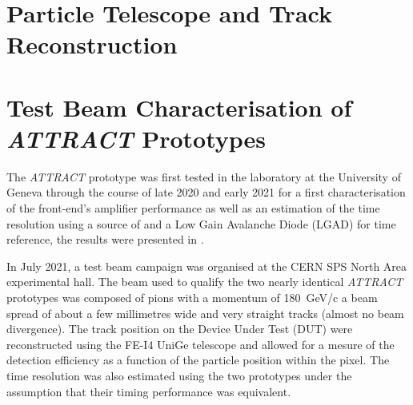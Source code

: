%	

	\section{Particle Telescope and Track Reconstruction}

	\clearpage
	\section{Test Beam Characterisation of \textit{ATTRACT} Prototypes}
		The \textit{ATTRACT} prototype was first tested in the laboratory at the University of Geneva through the course of late 2020 and early 2021 for a first characterisation of the front-end's amplifier performance as well as an estimation of the time resolution using a source of \Sr and a Low Gain Avalanche Diode (LGAD) for time reference, the results were presented in \cite{Moretti_MasterThesis}.
		
		In July 2021, a test beam campaign was organised at the CERN SPS North Area experimental hall. The beam used to qualify the two nearly identical \textit{ATTRACT} prototypes was composed of pions with a momentum of \SI{180}{\giga\electronvolt}/c a beam spread of about a few millimetres wide and very straight tracks (almost no beam divergence). The track position on the Device Under Test (DUT) were reconstructed using the FE-I4 UniGe telescope \cite{telescope} and allowed for a mesure of the detection efficiency as a function of the particle position within the pixel. The time resolution was also estimated using the two prototypes under the assumption that their timing performance was equivalent. 
		

